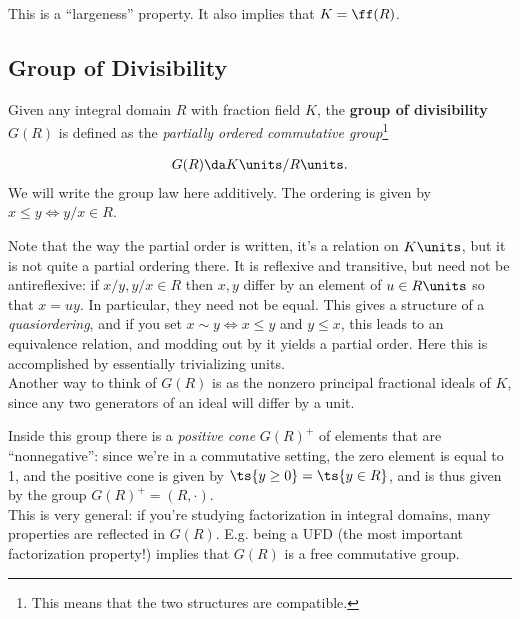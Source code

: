 \begin{remark}

This is a ``largeness'' property. It also implies that \(K = \ff(R)\).

\end{remark}

\hypertarget{group-of-divisibility}{%
\subsection{Group of Divisibility}\label{group-of-divisibility}}

\begin{definition}

Given any integral domain \(R\) with fraction field \(K\), the
\textbf{group of divisibility} \(G(R)\) is defined as the
\emph{partially ordered commutative group}\footnote{This means that the
  two structures are compatible.}

\begin{align*}  
G(R) \da K\units / R\units
.\end{align*} We will write the group law here additively. The ordering
is given by \(x\leq y \iff y/x \in R\).

\end{definition}

\begin{remark}

Note that the way the partial order is written, it's a relation on
\(K\units\), but it is not quite a partial ordering there. It is
reflexive and transitive, but need not be antireflexive: if
\(x/y, y/x\in R\) then \(x,y\) differ by an element of \(u\in R\units\)
so that \(x=uy\). In particular, they need not be equal. This gives a
structure of a \emph{quasiordering}, and if you set
\(x\sim y \iff x\leq y\) and \(y\leq x\), this leads to an equivalence
relation, and modding out by it yields a partial order. Here this is
accomplished by essentially trivializing units.\\

Another way to think of \(G(R)\) is as the nonzero principal fractional
ideals of \(K\), since any two generators of an ideal will differ by a
unit.

\end{remark}

\begin{remark}

Inside this group there is a \emph{positive cone} \(G(R)^+\) of elements
that are ``nonnegative'': since we're in a commutative setting, the zero
element is equal to 1, and the positive cone is given by
\(\ts{y\geq 0} = \ts{y\in R}\), and is thus given by the group
\(G(R)^+ = (R, \cdot)\).\\

This is very general: if you're studying factorization in integral
domains, many properties are reflected in \(G(R)\). E.g. being a UFD
(the most important factorization property!) implies that \(G(R)\) is a
free commutative group.

\end{remark}

